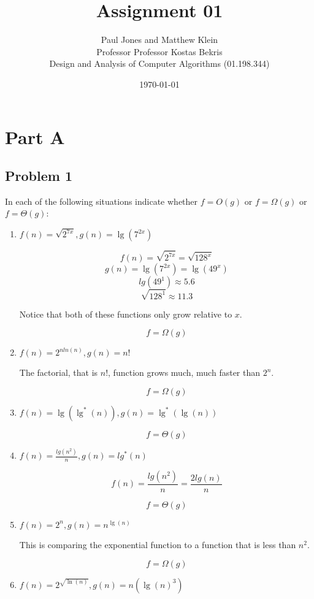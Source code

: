 \documentclass[11pt]{article}
\title{Assignment 01}
\author{Paul Jones and Matthew Klein \\
		Professor Professor Kostas Bekris\\
		Design and Analysis of Computer Algorithms (01.198.344)}
\date{\today}
\begin{document}
\maketitle

\pagebreak

\section*{Part A}

\subsection*{Problem 1}

In each of the following situations indicate whether $f = O(g)$ or $f = \Omega(g)$ 
or $f = \Theta(g)$:

\begin{enumerate}

	\item $f(n) = \sqrt{2^{7x}}, g(n) = \lg(7^{2x})$
		
		\[ f(n) = \sqrt{2^{7x}} = \sqrt{128^{x}}\]
		\[ g(n) = \lg(7^{2x}) = \lg(49^{x})\]
		\[ lg(49^1) \approx 5.6 \]
		\[ \sqrt{128^{1}} \approx 11.3 \]
		
		Notice that both of these functions only grow relative to $x$.
		
		\[ f = \Omega(g) \]
	
	\item $f(n) = 2^{nln(n)}, g(n) = n!$
	
		The factorial, that is $n!$, function grows much, much faster than $2^n$.
		
		\[ f = \Omega(g) \]
	
	\item $f(n) = \lg(\lg^*(n)), g(n) = \lg^*(\lg(n)) $
	
		\[ f = \Theta(g) \]
	
	\item $f(n) = \frac{lg(n^2)}{n}, g(n) = lg^*(n)$
	
		\[f(n) = \frac{lg(n^2)}{n} = \frac{2 lg(n)}{n}\]
		
		\[ f = \Theta(g) \]
		
	\item $f(n) = 2^n, g(n) = n^{\lg(n)}$
	
		This is comparing the exponential function to a function that is less than
		$n^2$.
		
		\[ f = \Omega(g) \]
		
	\item $f(n) = 2^{\sqrt{\ln(n)}}, g(n) = n(\lg(n)^3)$
	

\end{enumerate}
\end{document}
